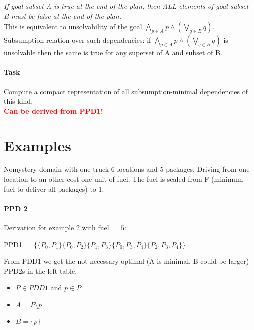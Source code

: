 \documentclass[12pt]{article}
\begin{document}
\textit{If goal subset A is true at the end of the plan, 
then ALL elements of goal subset B must be false at the end of the plan.}\\

\noindent
This is equivalent to unsolvability of the goal 
$\bigwedge_{p \in A} p \wedge (\bigvee_{q \in B} q)$.
Subsumption relation over such dependencies: 
if $\bigwedge_{p \in A} p \wedge (\bigvee_{q \in B} q)$ is unsolvable 
then the same is true for any superset of A and subset of B.

\paragraph{Task}
Compute a compact representation of all subsumption-minimal dependencies of this kind.\\

\noindent
\textcolor{red}{\textbf{Can be derived from PPD1!}}


\newpage
\section{Examples}

Nomystery domain with one truck 6 locations and 5 packages. 
Driving from one location to an other cost one unit of fuel. 
The fuel is scaled from F (minimum fuel to deliver all packages) to 1. \\





\newpage
\paragraph{PPD 2}
Derivation for example 2 with fuel $ = 5$:

\begin{center}
	PPD1 $ =\{ \{P_0, P_1\} \{P_0, P_2\} \{P_1, P_3\} \{P_0, P_3, P_4\} \{P_2, P_3, P_4\} \}$
\end{center}

\noindent
From PDD1 we get the not necessary optimal (A is minimal, B could be larger) PPD2s in the left table. 

\begin{itemize}
	\item $P \in PDD1$ and $ p \in P$
	\item $A = P \setminus p$
	\item $B = \{p\}$
\end{itemize}
\end{document}
